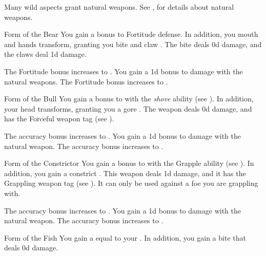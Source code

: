         Many wild aspects grant natural weapons.
        See , for details about natural weapons.

        {
            \begin{freeability}{Form of the Bear}
                You gain a  bonus to Fortitude defense.
                In addition, you mouth and hands transform, granting you bite and claw .
                The bite deals \plus0d damage, and the claws deal \minus1d damage.

                \rankline
                 The Fortitude bonus increases to .
                 You gain a \plus1d bonus to damage with the natural weapons.
                 The Fortitude bonus increases to .
            \end{freeability}

            \begin{freeability}{Form of the Bull}
                You gain a  bonus to  with the \textit{shove} ability (see ).
                In addition, your head transforms, granting you a gore .
                The weapon deals \plus0d damage, and has the Forceful weapon tag (see ).

                \rankline
                 The accuracy bonus increases to .
                 You gain a \plus1d bonus to damage with the natural weapon.
                 The accuracy bonus increases to .
            \end{freeability}

            \begin{freeability}{Form of the Constrictor}
                You gain a  bonus to  with the Grapple ability (see ).
                In addition, you gain a constrict .
                This weapon deals \plus1d damage, and it has the Grappling weapon tag (see ).
                It can only be used against a foe you are grappling with.

                \rankline
                 The accuracy bonus increases to .
                 You gain a \plus1d bonus to damage with the natural weapon.
                 The accuracy bonus increases to .
            \end{freeability}

            \begin{freeability}{Form of the Fish}
                You gain a  equal to your .
                In addition, you gain a bite  that deals \plus0d damage.


\end{freeability}}
